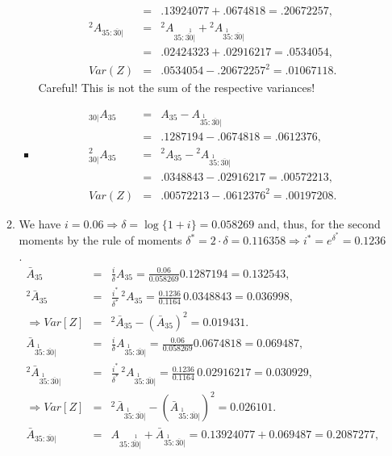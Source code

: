 \documentclass[11pt,fleqn,oneside]{book}
\begin{document}
\begin{enumerate}
\begin{enumerate}
\begin{itemize}
\begin{eqnarray*}
 &=& .13924077 + .0674818 = .20672257,\\
 {^2A_{35:\overline{30}|}} &=&  {^2A_{35:\stackrel{1}{\overline{30}|}}}  +  {^2A_{\stackrel{1}{35}:\overline{30}|}}\\
 &=& .02424323 + .02916217 = .0534054,\\
 Var(Z) &=& .0534054 -  .20672257^2 = .01067118.
 \end{eqnarray*}
 Careful! This is not the sum of the respective variances!
 \item
 \begin{eqnarray*}
 {_{30|}A_{35}} &=& {A_{35}} -  {A_{\stackrel{1}{35}:\overline{30}|}} \\
 &=& .1287194 - .0674818 = .0612376,\\
 {^2_{30|}A_{35}} &=& {^2A_{35}} -  {^2A_{\stackrel{1}{35}:\overline{30}|}} \\
 &=& .0348843 - .02916217 = .00572213,\\
 Var(Z) &=& .00572213 - .0612376^2 = .00197208.
 \end{eqnarray*}
\end{itemize}
\item We have $i = 0.06 \Rightarrow \delta = \log\{1+i\} = 0.058269$ and, thus, for the second moments by the rule of moments $\delta^* = 2\cdot \delta = 0.116358 \Rightarrow i^* = e^{\delta^*} = 0.1236$. 
 \begin{eqnarray*}
 {\bar{A}_{35}} &=& \frac{i}{\delta} {A_{35}} = \frac{0.06}{0.058269} 0.1287194 = 0.132543,\\
 {^2\bar{A}_{35}} &=& \frac{i^*}{\delta^*}\, {^2A_{35}} = \frac{0.1236}{0.1164} \,0.0348843 = 0.036998,\\
 \Rightarrow Var[Z] &=&  {^2\bar{A}_{35}} - \left({\bar{A}_{35}}\right)^2 = 0.019431.\\
 {\bar{A}_{\stackrel{1}{35}:\overline{30}|}} &=&\frac{i}{\delta}    {A_{\stackrel{1}{35}:\overline{30}|}} 
= \frac{0.06}{0.058269} 0.0674818 = 0.069487,\\
{^2\bar{A}_{\stackrel{1}{35}:\overline{30}|}} &=&\frac{i^*}{\delta^*} \, {^2A_{\stackrel{1}{35}:\overline{30}|}} 
= \frac{0.1236}{0.1164} \,0.02916217 = 0.030929,\\
\Rightarrow Var[Z] &=&  {^2\bar{A}_{\stackrel{1}{35}:\overline{30}|}} - \left({\bar{A}_{\stackrel{1}{35}:\overline{30}|}} \right)^2 = 0.026101.\\
 {\bar{A}_{35:\overline{30}|}} &=&  {A_{35:\stackrel{1}{\overline{30}|}}}  +  {\bar{A}_{\stackrel{1}{35}:\overline{30}|}} =  0.13924077 + 0.069487 = 0.2087277,\\

\end{eqnarray*}
\end{enumerate}
\end{enumerate}
\end{document}
